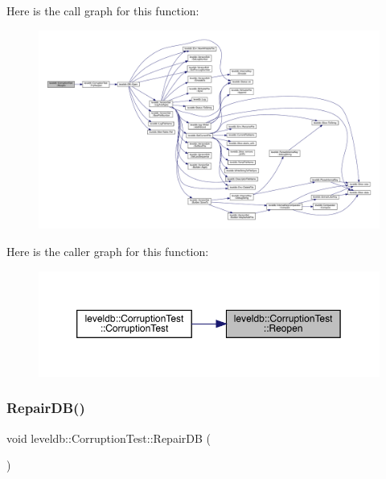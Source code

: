 Here is the call graph for this function\+:
\nopagebreak
\begin{figure}[H]
\begin{center}
\leavevmode
\includegraphics[width=350pt]{classleveldb_1_1_corruption_test_aa2051faee6b6542d35ebdcf99918a713_cgraph}
\end{center}
\end{figure}
Here is the caller graph for this function\+:
\nopagebreak
\begin{figure}[H]
\begin{center}
\leavevmode
\includegraphics[width=350pt]{classleveldb_1_1_corruption_test_aa2051faee6b6542d35ebdcf99918a713_icgraph}
\end{center}
\end{figure}
\mbox{\label{classleveldb_1_1_corruption_test_aff36b45496c39a006a14df201ef7d57b}} 
\subsubsection{\texorpdfstring{RepairDB()}{RepairDB()}}
{\footnotesize\ttfamily void leveldb\+::\+Corruption\+Test\+::\+Repair\+DB (\begin{DoxyParamCaption}{ }\end{DoxyParamCaption})\hspace{0.3cm}{\ttfamily [inline]}}

